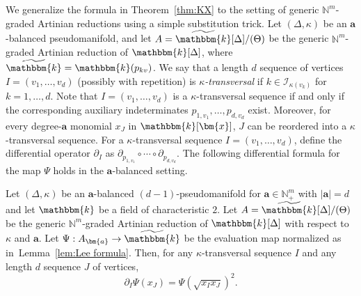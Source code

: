 We generalize the formula in Theorem~\ref{thm:KX} to the setting of generic $\mathbb{N}^m$-graded Artinian reductions using a simple substitution trick.
Let $(\Delta,\kappa)$ be an $\bm{a}$-balanced pseudomanifold, and let $A=\widetilde{\mathbbm{k}}[\Delta]/(\Theta)$ be the generic $\mathbb{N}^m$-graded Artinian reduction of $\mathbbm{k}[\Delta]$, where $\widetilde{\mathbbm{k}}=\mathbbm{k}(p_{kv})$.
We say that a length $d$ sequence of vertices $I=(v_1,\ldots,v_d)$ (possibly with repetition) is \emph{$\kappa$-transversal} if $k \in \mathcal{I}_{\kappa(v_k)}$ for $k=1,\ldots,d$.
Note that $I=(v_1,\ldots,v_d)$ is a $\kappa$-transversal sequence if and only if the corresponding auxiliary indeterminates $p_{1,v_1}, \ldots, p_{d,v_d}$ exist.
Moreover, for every degree-$\bm{a}$ monomial $x_J$ in $\mathbbm{k}[\bm{x}]$, $J$ can be reordered into a $\kappa$-transversal sequence.
For a $\kappa$-transversal sequence $I=(v_1,\ldots,v_d)$, define the differential operator $\partial_I$ as $\partial_{p_{1,v_1}}\circ \cdots \circ \partial_{p_{d,v_d}}$.
The following differential formula for the map $\Psi$ holds in the $\bm{a}$-balanced setting.
\begin{lemma} \label{lem:diff}
Let $(\Delta,\kappa)$ be an $\bm{a}$-balanced $(d-1)$-pseudomanifold for $\bm{a}\in\mathbb{N}^m_+$ with $|\bm{a}|=d$ and let $\mathbbm{k}$ be a field of characteristic $2$.
Let $A=\widetilde{\mathbbm{k}}[\Delta]/(\Theta)$ be the generic $\mathbb{N}^m$-graded Artinian reduction of $\mathbbm{k}[\Delta]$ with respect to $\kappa$ and $\bm{a}$.
Let $\Psi:A_{\bm{a}} \rightarrow \widetilde{\mathbbm{k}}$ be the evaluation map normalized as in~Lemma~\ref{lem:Lee formula}.
Then, for any $\kappa$-transversal sequence $I$ and any length $d$ sequence $J$ of vertices,
\[
\partial_I \Psi(x_J) =\Psi(\sqrt{x_Ix_J})^2.
\]
\end{lemma}
